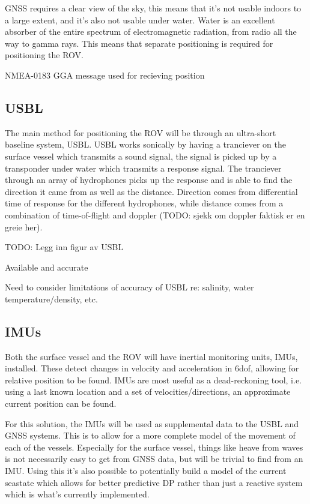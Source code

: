 \documentclass[class=article, crop=false, draft=true]{standalone}
\begin{document}
GNSS requires a clear view of the sky, this means that it's not usable indoors to a large extent, and it's also not usable under water. Water is an excellent absorber of the entire spectrum of electromagnetic radiation, from radio all the way to gamma rays. This means that separate positioning is required for positioning the ROV.

NMEA-0183 GGA message used for recieving position

\subsection{USBL}
The main method for positioning the ROV will be through an ultra-short baseline system, USBL. USBL works sonically by having a tranciever on the surface vessel which transmits a sound signal, the signal is picked up by a transponder under water which transmits a response signal. The tranciever through an array of hydrophones picks up the response and is able to find the direction it came from as well as the distance. Direction comes from differential time of response for the different hydrophones, while distance comes from a combination of time-of-flight and doppler (TODO: sjekk om doppler faktisk er en greie her).

TODO: Legg inn figur av USBL

Available and accurate

Need to consider limitations of accuracy of USBL re: salinity, water temperature/density, etc.

\subsection{IMUs}
Both the surface vessel and the ROV will have inertial monitoring units, IMUs, installed. These detect changes in velocity and acceleration in 6dof, allowing for relative position to be found. IMUs are most useful as a dead-reckoning tool, i.e. using a last known location and a set of velocities/directions, an approximate current position can be found.

For this solution, the IMUs will be used as supplemental data to the USBL and GNSS systems. This is to allow for a more complete model of the movement of each of the vessels. Especially for the surface vessel, things like heave from waves is not necessarily easy to get from GNSS data, but will be trivial to find from an IMU. Using this it's also possible to potentially build a model of the current seastate which allows for better predictive DP rather than just a reactive system which is what's currently implemented.
\end{document}

